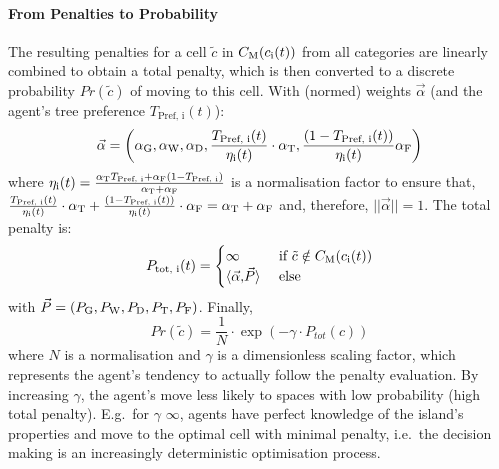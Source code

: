 \paragraph{From Penalties to Probability}
The resulting penalties for a cell  $\tilde{c}$ in $C_{\rm M}(c_{\rm i}(t))$ from all categories are linearly combined to obtain a total penalty, which is then converted to a discrete probability $Pr(\tilde{c})$ of moving to this cell.
With (normed) weights $\vec{\alpha}$ (and the agent's tree preference $T_\text{Pref, i}(t)$):
\begin{equation}\label{eq:vecalpha}
\vec{\alpha} = \left(\alpha_{\rm G},  \alpha_{\rm W}, \alpha_{\rm D},  \frac{T_\text{Pref, i}(t)}{\eta_{\rm i}(t)} \cdot \alpha_{\rm T}, \frac{(1-T_\text{Pref, i}(t))}{\eta_{\rm i}(t)} \alpha_{\rm F}\right)
\end{equation} 
where $\eta_{\rm i}(t) = \frac{\alpha_{\rm T} T_\text{Pref, i}+ \alpha_{\rm F} (1-T_\text{Pref, i})}{\alpha_{\rm T}+\alpha_{\rm F}}$ is a normalisation factor to ensure that, $\frac{T_\text{Pref, i}(t)}{\eta_{\rm i}(t)}\cdot \alpha_{\rm T} + \frac{(1-T_\text{Pref, i}(t))}{\eta_{\rm i}(t)} \cdot \alpha_{\rm F} = \alpha_{\rm T}+ \alpha_{\rm F}$ and, therefore, $||\vec{\alpha}||=1$. 
The total penalty is:
\begin{equation}
P_\text{tot, i}(t) =  \begin{cases} \infty & \text{ if } \tilde{c}\notin C_{\rm M}(c_{\rm i}(t))\\
	 \langle \vec{\alpha}{, } \vec{P} \rangle &  \text{ else}
	 \end{cases}
\end{equation}
with $\vec{P} = (P_{\rm G}, P_{\rm W}, P_{\rm D}, P_{\rm T}, P_{\rm F})$.
Finally, 
\begin{equation}
	Pr(\tilde{c})  = \frac{1}{N} \cdot \exp \left( - \gamma \cdot P_{tot}(c) \right) 
\end{equation}
where $N$ is a normalisation and $\gamma$ is a dimensionless scaling factor, which represents the agent's tendency to actually follow the penalty evaluation. 
By increasing $\gamma$, the agent's move less likely to spaces with low probability (high total penalty). 
E.g.\ for $\gamma$ \ra $\infty$, agents have perfect knowledge of the island's properties and move to the optimal cell with minimal penalty, i.e.\ the decision making is an increasingly deterministic optimisation process\footnotemark.
